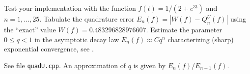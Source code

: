 \begin{problem}
\begin{subproblem}[2]
Test your implementation with the function $f(t)=1/(2+e^{3t})$ and
$n=1,\dots,25$. Tabulate the quadrature error $E_n(f)=|W(f)-Q^U_n(f)|$ using the
``exact'' value $W(f)=0.483296828976607$. Estimate the parameter $0\le q<1$ in the
asymptotic decay law $E_n(f)\approx Cq^n$ characterizing (sharp) exponential
convergence, see . 
\begin{solution}
See file \texttt{quadU.cpp}.  An approximation of $q$ is given by $E_n(f)/E_{n-1}(f)$.
\end{solution}
\end{subproblem}


\end{problem}